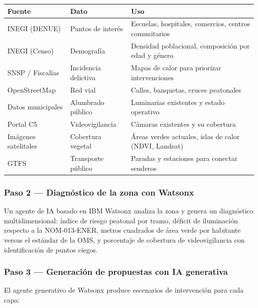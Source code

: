 \documentclass[12pt,a4paper]{article}
\begin{document}
\begin{table}[H]
\centering
\small
\begin{tabularx}{\textwidth}{l l X}
\toprule
\textbf{Fuente} & \textbf{Dato} & \textbf{Uso} \\
\midrule
INEGI (DENUE) & Puntos de interés & Escuelas, hospitales, comercios, centros comunitarios \\
INEGI (Censo) & Demografía & Densidad poblacional, composición por edad y género \\
SNSP / Fiscalías & Incidencia delictiva & Mapas de calor para priorizar intervenciones \\
OpenStreetMap & Red vial & Calles, banquetas, cruces peatonales \\
Datos municipales & Alumbrado público & Luminarias existentes y estado operativo \\
Portal C5 & Videovigilancia & Cámaras existentes y su cobertura \\
Imágenes satelitales & Cobertura vegetal & Áreas verdes actuales, islas de calor (NDVI, Landsat) \\
GTFS & Transporte público & Paradas y estaciones para conectar senderos \\
\bottomrule
\end{tabularx}
\end{table}

\subsubsection{Paso 2 — Diagnóstico de la zona con Watsonx}

Un agente de IA basado en IBM Watsonx analiza la zona y genera un diagnóstico multidimensional: índice de riesgo peatonal por tramo, déficit de iluminación respecto a la NOM-013-ENER, metros cuadrados de área verde por habitante versus el estándar de la OMS, y porcentaje de cobertura de videovigilancia con identificación de puntos ciegos.

\subsubsection{Paso 3 — Generación de propuestas con IA generativa}

El agente generativo de Watsonx produce escenarios de intervención para cada capa:
\end{document}
